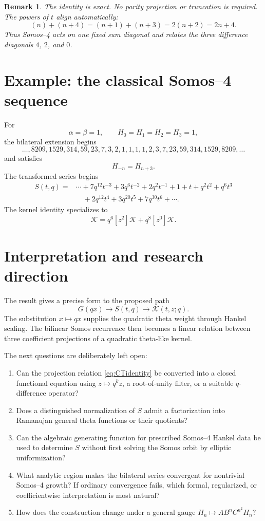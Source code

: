 \documentclass[11pt]{article}
\newtheorem{remark}{Remark}
\begin{document}
\begin{remark}
The identity is exact. No parity projection or truncation is required. The powers of $t$ align automatically:
\[
 (n)+(n+4)=(n+1)+(n+3)=2(n+2)=2n+4.
\]
Thus Somos--4 acts on one fixed sum diagonal and relates the three difference diagonals $4$, $2$, and $0$.
\end{remark}

\section{Example: the classical Somos--4 sequence}
For
\[
 \alpha=\beta=1,
 \qquad H_0=H_1=H_2=H_3=1,
\]
the bilateral extension begins
\[
 \ldots,8209,1529,314,59,23,7,3,2,1,1,1,1,2,3,7,23,59,314,1529,8209,\ldots
\]
and satisfies
\[
 H_{-n}=H_{n+3}.
\]
The transformed series begins
\begin{align*}
 S(t,q)={}&\cdots+7q^{12}t^{-3}+3q^6t^{-2}+2q^2t^{-1}
 +1+t+q^2t^2+q^6t^3\\
 &\quad+2q^{12}t^4+3q^{20}t^5+7q^{30}t^6+\cdots.
\end{align*}
The kernel identity specializes to
\begin{equation}
 [z^4]\mathcal K=q^6[z^2]\mathcal K+q^8[z^0]\mathcal K.
\end{equation}

\section{Interpretation and research direction}
The result gives a precise form to the proposed path
\[
 G(qx)\longrightarrow S(t,q)\longrightarrow\mathcal K(t,z;q).
\]
The substitution $x\mapsto qx$ supplies the quadratic theta weight through Hankel scaling. The bilinear Somos recurrence then becomes a linear relation between three coefficient projections of a quadratic theta-like kernel.

The next questions are deliberately left open:
\begin{enumerate}
 \item Can the projection relation \eqref{eq:CTidentity} be converted into a closed functional equation using $z\mapsto q^kz$, a root-of-unity filter, or a suitable $q$-difference operator?
 \item Does a distinguished normalization of $S$ admit a factorization into Ramanujan general theta functions or their quotients?
 \item Can the algebraic generating function for prescribed Somos--4 Hankel data be used to determine $S$ without first solving the Somos orbit by elliptic uniformization?
 \item What analytic region makes the bilateral series convergent for nontrivial Somos--4 growth? If ordinary convergence fails, which formal, regularized, or coefficientwise interpretation is most natural?
 \item How does the construction change under a general gauge $H_n\mapsto A B^n C^{n^2}H_n$?
\end{enumerate}
\end{document}
